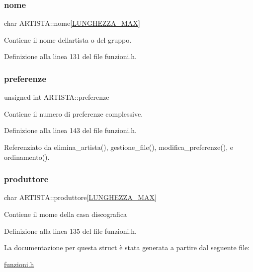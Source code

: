 \subsubsection{\texorpdfstring{nome}{nome}}
{\footnotesize\ttfamily char A\+R\+T\+I\+S\+T\+A\+::nome\mbox{[}\hyperlink{funzioni_8h_a2cdd71b92d6e869f8b094e32a6da6a62}{L\+U\+N\+G\+H\+E\+Z\+Z\+A\+\_\+\+M\+AX}\mbox{]}}

Contiene il nome dell\textquotesingle{}artista o del gruppo. 

Definizione alla linea 131 del file funzioni.\+h.

\mbox{\label{struct_a_r_t_i_s_t_a_a864c672ed1a5c81d1daf02093e11eb05}} 
\subsubsection{\texorpdfstring{preferenze}{preferenze}}
{\footnotesize\ttfamily unsigned int A\+R\+T\+I\+S\+T\+A\+::preferenze}

Contiene il numero di preferenze complessive. 

Definizione alla linea 143 del file funzioni.\+h.



Referenziato da elimina\+\_\+artista(), gestione\+\_\+file(), modifica\+\_\+preferenze(), e ordinamento().

\mbox{\label{struct_a_r_t_i_s_t_a_a444c256b4120246fcbf1804377e61e32}} 
\subsubsection{\texorpdfstring{produttore}{produttore}}
{\footnotesize\ttfamily char A\+R\+T\+I\+S\+T\+A\+::produttore\mbox{[}\hyperlink{funzioni_8h_a2cdd71b92d6e869f8b094e32a6da6a62}{L\+U\+N\+G\+H\+E\+Z\+Z\+A\+\_\+\+M\+AX}\mbox{]}}

Contiene il mome della casa discografica 

Definizione alla linea 135 del file funzioni.\+h.



La documentazione per questa struct è stata generata a partire dal seguente file\+:\begin{DoxyCompactItemize}
\item 
\hyperlink{funzioni_8h}{funzioni.\+h}\end{DoxyCompactItemize}
